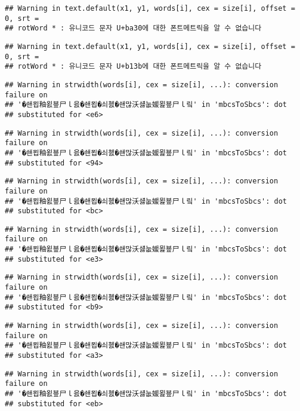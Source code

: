 \documentclass[]{article}
\begin{document}
\begin{verbatim}
## Warning in text.default(x1, y1, words[i], cex = size[i], offset = 0, srt =
## rotWord * : 유니코드 문자 U+ba30에 대한 폰트메트릭을 알 수 없습니다
\end{verbatim}

\begin{verbatim}
## Warning in text.default(x1, y1, words[i], cex = size[i], offset = 0, srt =
## rotWord * : 유니코드 문자 U+b13b에 대한 폰트메트릭을 알 수 없습니다
\end{verbatim}

\begin{verbatim}
## Warning in strwidth(words[i], cex = size[i], ...): conversion failure on
## '�쇈묍釉욄뵾尸ｌ읈�쇈묍�쇠쳸�쇈많沃섏눖媛묉뵾尸ｌ맄' in 'mbcsToSbcs': dot
## substituted for <e6>
\end{verbatim}

\begin{verbatim}
## Warning in strwidth(words[i], cex = size[i], ...): conversion failure on
## '�쇈묍釉욄뵾尸ｌ읈�쇈묍�쇠쳸�쇈많沃섏눖媛묉뵾尸ｌ맄' in 'mbcsToSbcs': dot
## substituted for <94>
\end{verbatim}

\begin{verbatim}
## Warning in strwidth(words[i], cex = size[i], ...): conversion failure on
## '�쇈묍釉욄뵾尸ｌ읈�쇈묍�쇠쳸�쇈많沃섏눖媛묉뵾尸ｌ맄' in 'mbcsToSbcs': dot
## substituted for <bc>
\end{verbatim}

\begin{verbatim}
## Warning in strwidth(words[i], cex = size[i], ...): conversion failure on
## '�쇈묍釉욄뵾尸ｌ읈�쇈묍�쇠쳸�쇈많沃섏눖媛묉뵾尸ｌ맄' in 'mbcsToSbcs': dot
## substituted for <e3>
\end{verbatim}

\begin{verbatim}
## Warning in strwidth(words[i], cex = size[i], ...): conversion failure on
## '�쇈묍釉욄뵾尸ｌ읈�쇈묍�쇠쳸�쇈많沃섏눖媛묉뵾尸ｌ맄' in 'mbcsToSbcs': dot
## substituted for <b9>
\end{verbatim}

\begin{verbatim}
## Warning in strwidth(words[i], cex = size[i], ...): conversion failure on
## '�쇈묍釉욄뵾尸ｌ읈�쇈묍�쇠쳸�쇈많沃섏눖媛묉뵾尸ｌ맄' in 'mbcsToSbcs': dot
## substituted for <a3>
\end{verbatim}

\begin{verbatim}
## Warning in strwidth(words[i], cex = size[i], ...): conversion failure on
## '�쇈묍釉욄뵾尸ｌ읈�쇈묍�쇠쳸�쇈많沃섏눖媛묉뵾尸ｌ맄' in 'mbcsToSbcs': dot
## substituted for <eb>
\end{verbatim}
\end{document}
